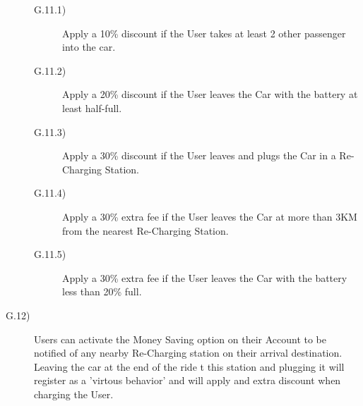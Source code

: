 \documentclass[a4paper]{article}
\begin{document}
\begin{description}
\begin{description}
\item [G.11.1)]Apply a 10\% discount if the User takes at least 2 other passenger into the car.
\item [G.11.2)]Apply a 20\% discount if the User leaves the Car with the battery at least half-full.
\item [G.11.3)]Apply a 30\% discount if the User leaves and plugs the Car in a Re-Charging Station.
\item [G.11.4)]Apply a 30\% extra fee if the User leaves the Car at more than 3KM from the nearest Re-Charging Station.
\item [G.11.5)]Apply a 30\% extra fee if the User leaves the Car with the battery less than 20\% full.
\end{description}
\item [G.12)]Users can activate the Money Saving option on their Account to be notified of any nearby Re-Charging station on their arrival destination. Leaving the car at the end of the ride t this station and plugging it will register as a 'virtous behavior' and will apply and extra discount when charging the User.
\end{description}
\end{document}
